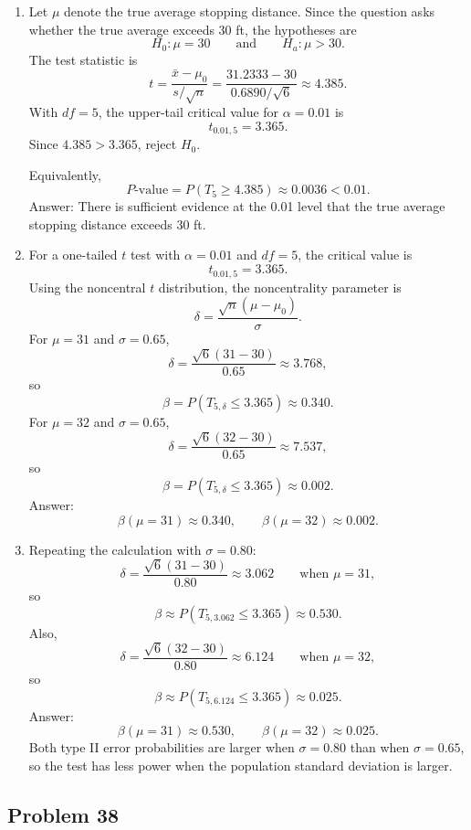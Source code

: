 \documentclass[11pt]{article}
\begin{document}
\begin{enumerate}
\item[(a)] Let $\mu$ denote the true average stopping distance. Since the question asks whether the true average exceeds 30 ft, the hypotheses are
\[
H_0:\mu=30
\qquad \text{and} \qquad
H_a:\mu>30.
\]
The test statistic is
\[
t=\frac{\bar{x}-\mu_0}{s/\sqrt{n}}
=\frac{31.2333-30}{0.6890/\sqrt{6}}
\approx 4.385.
\]
With $df=5$, the upper-tail critical value for $\alpha=0.01$ is
\[
t_{0.01,5}=3.365.
\]
Since $4.385>3.365$, reject $H_0$.

Equivalently,
\[
P\text{-value}=P(T_5\ge 4.385)\approx 0.0036<0.01.
\]
Answer: There is sufficient evidence at the 0.01 level that the true average stopping distance exceeds 30 ft.

\item[(b)] For a one-tailed $t$ test with $\alpha=0.01$ and $df=5$, the critical value is
\[
t_{0.01,5}=3.365.
\]
Using the noncentral $t$ distribution, the noncentrality parameter is
\[
\delta=\frac{\sqrt{n}(\mu-\mu_0)}{\sigma}.
\]
For $\mu=31$ and $\sigma=0.65$,
\[
\delta=\frac{\sqrt{6}(31-30)}{0.65}\approx 3.768,
\]
so
\[
\beta=P(T_{5,\delta}\le 3.365)\approx 0.340.
\]
For $\mu=32$ and $\sigma=0.65$,
\[
\delta=\frac{\sqrt{6}(32-30)}{0.65}\approx 7.537,
\]
so
\[
\beta=P(T_{5,\delta}\le 3.365)\approx 0.002.
\]
Answer:
\[
\beta(\mu=31)\approx 0.340,
\qquad
\beta(\mu=32)\approx 0.002.
\]

\item[(c)] Repeating the calculation with $\sigma=0.80$:
\[
\delta=\frac{\sqrt{6}(31-30)}{0.80}\approx 3.062
\qquad \text{when } \mu=31,
\]
so
\[
\beta\approx P(T_{5,3.062}\le 3.365)\approx 0.530.
\]
Also,
\[
\delta=\frac{\sqrt{6}(32-30)}{0.80}\approx 6.124
\qquad \text{when } \mu=32,
\]
so
\[
\beta\approx P(T_{5,6.124}\le 3.365)\approx 0.025.
\]
Answer:
\[
\beta(\mu=31)\approx 0.530,
\qquad
\beta(\mu=32)\approx 0.025.
\]
Both type II error probabilities are larger when $\sigma=0.80$ than when $\sigma=0.65$, so the test has less power when the population standard deviation is larger.
\end{enumerate}

\subsection*{Problem 38}
\end{document}
